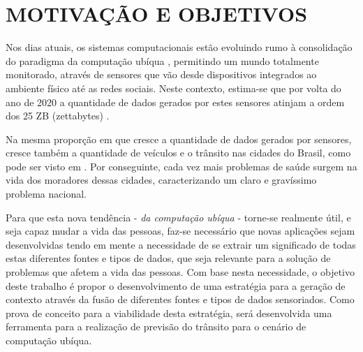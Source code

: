 \section{MOTIVAÇÃO E OBJETIVOS}
Nos dias atuais, os sistemas computacionais estão evoluindo rumo à consolidação do paradigma da computação ubíqua \cite{weiser1991computer}, permitindo um mundo totalmente monitorado, através de sensores que vão desde dispositivos integrados ao ambiente físico até as redes sociais. Neste contexto, estima-se que por volta do ano de 2020 a quantidade de dados gerados por estes sensores atinjam a ordem dos 25 ZB (zettabytes) \cite{perera2014context}.

Na mesma proporção em que cresce a quantidade de dados gerados por sensores, cresce também a quantidade de veículos e o trânsito nas cidades do Brasil, como pode ser visto em \cite{ANTENOR2010}. Por conseguinte, cada vez mais problemas de saúde surgem na vida dos moradores dessas cidades, caracterizando um claro e gravíssimo problema nacional.

Para que esta nova tendência - \emph{da computação ubíqua} - torne-se realmente útil, e seja capaz mudar a vida das pessoas, faz-se necessário que novas aplicações sejam desenvolvidas tendo em mente a necessidade de se extrair um significado de todas estas diferentes fontes e tipos de dados, que seja relevante para a solução de problemas que afetem a vida das pessoas. Com base nesta necessidade, o objetivo deste trabalho é propor o desenvolvimento de uma estratégia para a geração de contexto \cite{abowd1999towards} através da fusão de diferentes fontes e tipos de dados sensoriados. Como prova de conceito para a viabilidade desta estratégia, será desenvolvida uma ferramenta para a realização de previsão do trânsito para o cenário de computação ubíqua.

